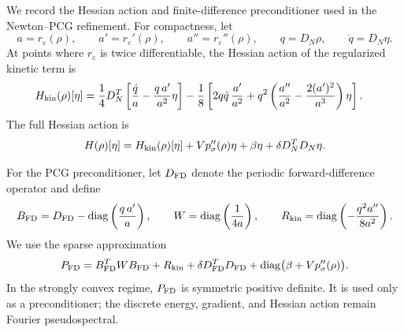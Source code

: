 \documentclass[11pt]{article}
\newcommand{\eps}{\varepsilon}
\newcommand{\sig}{\sigma}
\theoremstyle{plain}
\theoremstyle{definition}
\numberwithin{equation}{section}
\begin{document}
We record the Hessian action and finite-difference preconditioner used
in the Newton--PCG refinement. For compactness, let
\[
a=r_\eps(\rho),
\qquad
a'=r_\eps'(\rho),
\qquad
a''=r_\eps''(\rho),
\qquad
q=D_N\rho,
\qquad
\dot q=D_N\eta.
\]
At points where $r_\eps$ is twice differentiable, the Hessian action
of the regularized kinetic term is
\begin{align}
\label{eq:hessian-action}
H_{\rm kin}(\rho)[\eta]
={}&
\frac14D_N^T
\left[
\frac{\dot q}{a}
-
\frac{q\,a'}{a^2}\eta
\right]
-
\frac18
\left[
2q\dot q\,\frac{a'}{a^2}
+
q^2
\left(
\frac{a''}{a^2}
-
\frac{2(a')^2}{a^3}
\right)\eta
\right].
\end{align}
The full Hessian action is
\begin{equation}
\label{eq:full-hessian-action}
H(\rho)[\eta]
=
H_{\rm kin}(\rho)[\eta]
+
Vp_\sig''(\rho)\eta
+
\beta\eta
+
\delta D_N^TD_N\eta.
\end{equation}

For the PCG preconditioner, let $D_{\rm FD}$ denote the periodic
forward-difference operator and define
\[
B_{\rm FD}
=
D_{\rm FD}
-
\operatorname{diag}\left(\frac{q\,a'}{a}\right),
\qquad
W
=
\operatorname{diag}\left(\frac1{4a}\right),
\qquad
R_{\rm kin}
=
\operatorname{diag}\left(
-\frac{q^2a''}{8a^2}
\right).
\]
We use the sparse approximation
\begin{equation}
\label{eq:fd-preconditioner}
P_{\rm FD}
=
B_{\rm FD}^TWB_{\rm FD}
+
R_{\rm kin}
+
\delta D_{\rm FD}^TD_{\rm FD}
+
\operatorname{diag}\bigl(\beta+Vp_\sig''(\rho)\bigr).
\end{equation}
In the strongly convex regime, $P_{\rm FD}$ is symmetric positive
definite. It is used only as a preconditioner; the discrete energy,
gradient, and Hessian action remain Fourier pseudospectral.
\end{document}
